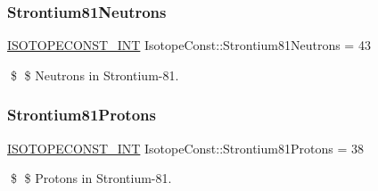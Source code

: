 \subsubsection{\texorpdfstring{Strontium81\+Neutrons}{Strontium81Neutrons}}
{\footnotesize\ttfamily \mbox{\hyperlink{group___isotope_const-_macros_ga5f18360b3e99483a35c32d789e62621c}{I\+S\+O\+T\+O\+P\+E\+C\+O\+N\+S\+T\+\_\+\+I\+NT}} Isotope\+Const\+::\+Strontium81\+Neutrons = 43}

\$ \$ Neutrons in Strontium-\/81. \mbox{\label{group___isotope_const-_strontium-_sr81_gabb94db416de6ba04602f7b2fd986541c}} 
\subsubsection{\texorpdfstring{Strontium81\+Protons}{Strontium81Protons}}
{\footnotesize\ttfamily \mbox{\hyperlink{group___isotope_const-_macros_ga5f18360b3e99483a35c32d789e62621c}{I\+S\+O\+T\+O\+P\+E\+C\+O\+N\+S\+T\+\_\+\+I\+NT}} Isotope\+Const\+::\+Strontium81\+Protons = 38}

\$ \$ Protons in Strontium-\/81. 